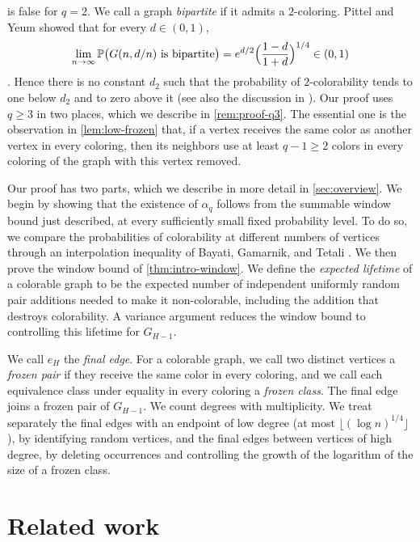  is false for $q = 2$. We call a graph \emph{bipartite} if it admits a $2$-coloring. Pittel and Yeum showed that for every $d \in (0, 1)$,
\[
\lim_{n \to \infty} \mathbb P\bigl(G(n, d/n) \text{ is bipartite}\bigr) = e^{d/2} \Bigl(\frac{1 - d}{1 + d}\Bigr)^{1/4} \in (0, 1)
\]
\cite[Section~1, equation~(1.5)]{pittel2010frequently}. Hence there is no constant $d_2$ such that the probability of $2$-colorability tends to one below $d_2$ and to zero above it (see also the discussion in \cite[p.~64]{achlioptas1999sharp}). Our proof uses $q \ge 3$ in two places, which we describe in \cref{rem:proof-q3}. The essential one is the observation in \cref{lem:low-frozen} that, if a vertex receives the same color as another vertex in every coloring, then its neighbors use at least $q - 1 \ge 2$ colors in every coloring of the graph with this vertex removed.

Our proof has two parts, which we describe in more detail in \cref{sec:overview}. We begin by showing that the existence of $\alpha_q$ follows from the summable window bound just described, at every sufficiently small fixed probability level. To do so, we compare the probabilities of colorability at different numbers of vertices through an interpolation inequality of Bayati, Gamarnik, and Tetali \cite[Theorem~5 and Proposition~2]{bayati2013combinatorial}. We then prove the window bound of \cref{thm:intro-window}. We define the \emph{expected lifetime} of a colorable graph to be the expected number of independent uniformly random pair additions needed to make it non-colorable, including the addition that destroys colorability. A variance argument reduces the window bound to controlling this lifetime for $G_{H - 1}$.

We call $e_H$ the \emph{final edge}. For a colorable graph, we call two distinct vertices a \emph{frozen pair} if they receive the same color in every coloring, and we call each equivalence class under equality in every coloring a \emph{frozen class}. The final edge joins a frozen pair of $G_{H - 1}$. We count degrees with multiplicity. We treat separately the final edges with an endpoint of low degree (at most $\lfloor(\log n)^{1/4}\rfloor$), by identifying random vertices, and the final edges between vertices of high degree, by deleting occurrences and controlling the growth of the logarithm of the size of a frozen class.

\section{Related work}\label{sec:intro-related}

